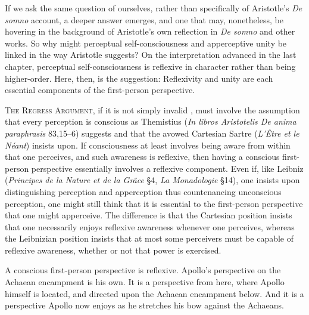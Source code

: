 If we ask the same question of ourselves, rather than specifically of Aristotle's \emph{De somno} account, a deeper answer emerges, and one that may, nonetheless, be hovering in the background of Aristotle's own reflection in \emph{De somno} and other works. So why might perceptual self-consciousness and apperceptive unity be linked in the way Aristotle suggests? On the interpretation advanced in the last chapter, perceptual self-consciousness is reflexive in character rather than being higher-order. Here, then, is the suggestion: Reflexivity and unity are each essential components of the first-person perspective.

\textsc{The Regress Argument}, if it is not simply invalid \citep[202]{Corkum:2010fa}, must involve the assumption that every perception is conscious as Themistius (\emph{In libros Aristotelis De anima paraphrasis}
83,15–6) suggests and that the avowed Cartesian Sartre (\emph{L'Être et le Néant}) insists upon. If consciousness at least involves being aware from within that one perceives, and such awareness is reflexive, then having a conscious first-person perspective essentially involves a reflexive component. Even if, like Leibniz (\emph{Principes de la Nature et de la Grâce} §4, \emph{La Monadologie} §14), one insists upon distinguishing perception and apperception thus countenancing unconscious perception, one might still think that it is essential to the first-person perspective that one might apperceive. The difference is that the Cartesian position insists that one necessarily enjoys reflexive awareness whenever one perceives, whereas the Leibnizian position insists that at most some perceivers must be capable of reflexive awareness, whether or not that power is exercised.

A conscious first-person perspective is reflexive. Apollo's perspective on the Achaean encampment is his own. It is a perspective from here, where Apollo himself is located, and directed upon the Achaean encampment below. And it is a perspective Apollo now enjoys as he stretches his bow against the Achaeans.


